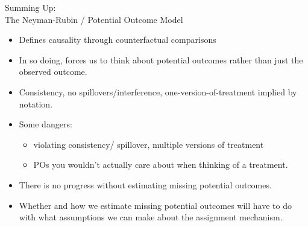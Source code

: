\documentclass[xcolor=dvipsnames]{beamer}
\begin{document}
\begin{frame}{Summing Up: \\The Neyman-Rubin / Potential Outcome Model}
\small
\begin{itemize}
\item<1-> Defines causality through counterfactual comparisons
\medskip
\item<2-> In so doing, forces us to think about potential outcomes rather than just the observed outcome.
\medskip
\item<3-> Consistency, no spillovers/interference, one-version-of-treatment implied by notation. 
\medskip
\item<4-> Some dangers: 
\scriptsize
\begin{itemize}
\item violating consistency/ spillover, multiple versions of treatment
\item POs you wouldn't actually care about when thinking of a treatment.
\end{itemize}
\small
\medskip
\item<4-> There is no progress without estimating missing potential outcomes.
\medskip
\item<5-> Whether and how we estimate missing potential outcomes will have to do with what assumptions we can make about the assignment mechanism.
\end{itemize}
\end{frame}
\end{document}
